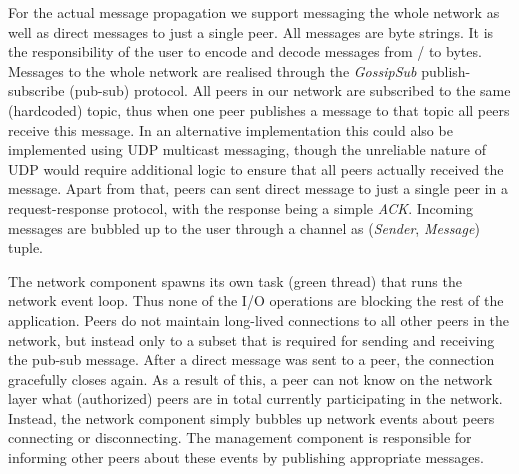 For the actual message propagation we support messaging the whole network as well as direct messages to just a single peer.
All messages are byte strings. 
It is the responsibility of the user to encode and decode messages from / to bytes.
Messages to the whole network are realised through the \textit{GossipSub} publish-subscribe (pub-sub) protocol. 
All peers in our network are subscribed to the same (hardcoded) topic, thus when one peer publishes a message to that topic all peers receive this message. 
In an alternative implementation this could also be implemented using UDP multicast messaging, though the unreliable nature of UDP would require additional logic to ensure that all peers actually received the message.
Apart from that, peers can sent direct message to just a single peer in a request-response protocol, with the response being a simple \textit{ACK}.
Incoming messages are bubbled up to the user through a channel as (\textit{Sender}, \textit{Message}) tuple.

The network component spawns its own task (green thread) that runs the network event loop. 
Thus none of the I/O operations are blocking the rest of the application.
Peers do not maintain long-lived connections to all other peers in the network, but instead only to a subset that is required for sending and receiving the pub-sub message.
After a direct message was sent to a peer, the connection gracefully closes again.
As a result of this, a peer can not know on the network layer what (authorized) peers are in total currently participating in the network.
Instead, the network component simply bubbles up network events about peers connecting or disconnecting.
The management component is responsible for informing other peers about these events by publishing appropriate messages. 
